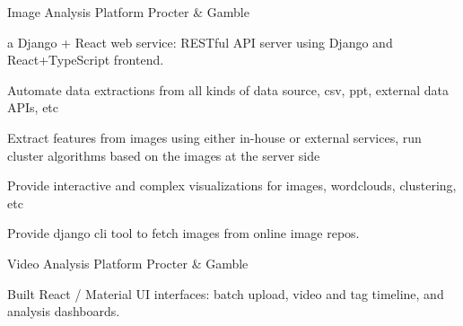 
\begin{cventries}
  \cventry
    {} %
    {Image Analysis Platform} %
    {Procter \& Gamble} %
    {} %
    {
      \begin{cvitems} %
        \item {a Django + React web service: RESTful API server using Django and React+TypeScript frontend.}
        \item {Automate data extractions from all kinds of data source, csv, ppt, external data APIs, etc}
        \item {Extract features from images using either in-house or external services, run cluster algorithms based on the images at the server side}
        \item {Provide interactive and complex visualizations for images, wordclouds, clustering, etc}
        \item {Provide django cli tool to fetch images from online image repos.}
      \end{cvitems}
    }

  \cventry
    {} %
    {Video Analysis Platform} %
    {Procter \& Gamble} %
    {} %
    {
      \begin{cvitems} %
        \item {Built React / Material UI interfaces: batch upload, video and tag timeline, and analysis dashboards.}
      \end{cvitems}
    }

\end{cventries}